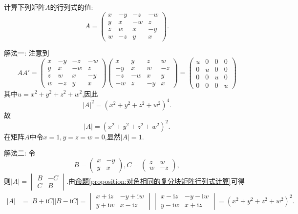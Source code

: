 \documentclass[../../main.tex]{subfiles}
\begin{document}
\begin{example}
计算下列矩阵\(A\)的行列式的值:
\[
A = 
\begin{pmatrix}
x & -y & -z & -w\\
y & x & -w & z\\
z & w & x & -y\\
w & -z & y & x
\end{pmatrix}.
\]
\end{example}
\begin{solution}
{\color{blue}解法一:}
注意到
\[
AA' = 
\begin{pmatrix}
x & -y & -z & -w\\
y & x & -w & z\\
z & w & x & -y\\
w & -z & y & x
\end{pmatrix}
\begin{pmatrix}
x & y & z & w\\
-y & x & w & -z\\
-z & -w & x & y\\
-w & z & -y & x
\end{pmatrix}
=
\begin{pmatrix}
u & 0 & 0 & 0\\
0 & u & 0 & 0\\
0 & 0 & u & 0\\
0 & 0 & 0 & u
\end{pmatrix}
\]
其中\(u = x^2 + y^2 + z^2 + w^2\),因此
\[
|A|^2=(x^2 + y^2 + z^2 + w^2)^4.
\]
故
\[
|A|=(x^2 + y^2 + z^2 + w^2)^2.
\]
在矩阵\(A\)中令\(x = 1,y = z = w = 0\),显然\(|A| = 1\).

{\color{blue}解法二:}
令
\[
B = 
\begin{pmatrix}
x & -y\\
y & x
\end{pmatrix},
C = 
\begin{pmatrix}
z & w\\
w & -z
\end{pmatrix},
\]
则\(|A| = 
\begin{vmatrix}
B & -C\\
C & B
\end{vmatrix}\).由\hyperref[proposition:对角相同的复分块矩阵行列式计算]{命题\ref{proposition:对角相同的复分块矩阵行列式计算}}可得
\begin{align*}
|A|&=|B + \mathrm{i}C||B - \mathrm{i}C|
=\begin{vmatrix}
x + \mathrm{i}z & -y + \mathrm{i}w\\
y + \mathrm{i}w & x - \mathrm{i}z
\end{vmatrix}\begin{vmatrix}
x - \mathrm{i}z & -y - \mathrm{i}w\\
y - \mathrm{i}w & x + \mathrm{i}z
\end{vmatrix}
=(x^2 + y^2 + z^2 + w^2)^2.
\end{align*}

\end{solution}
\end{document}
